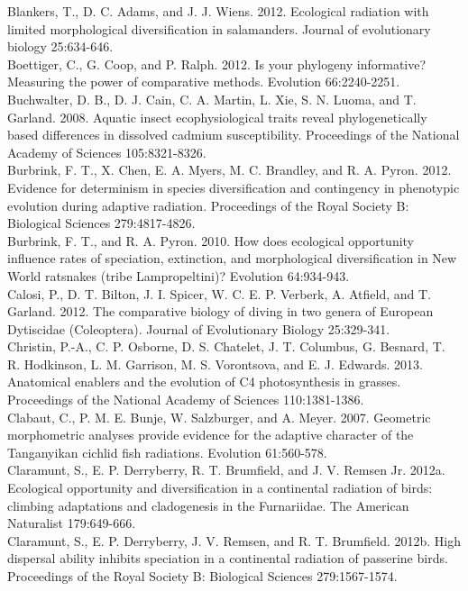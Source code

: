 Blankers, T., D. C. Adams, and J. J. Wiens. 2012. Ecological radiation with limited morphological diversification in salamanders. Journal of evolutionary biology 25:634-646.\\
Boettiger, C., G. Coop, and P. Ralph. 2012. Is your phylogeny informative? Measuring the power of comparative methods. Evolution 66:2240-2251.\\
Buchwalter, D. B., D. J. Cain, C. A. Martin, L. Xie, S. N. Luoma, and T. Garland. 2008. Aquatic insect ecophysiological traits reveal phylogenetically based differences in dissolved cadmium susceptibility. Proceedings of the National Academy of Sciences 105:8321-8326.\\
Burbrink, F. T., X. Chen, E. A. Myers, M. C. Brandley, and R. A. Pyron. 2012. Evidence for determinism in species diversification and contingency in phenotypic evolution during adaptive radiation. Proceedings of the Royal Society B: Biological Sciences 279:4817-4826.\\
Burbrink, F. T., and R. A. Pyron. 2010. How does ecological opportunity influence rates of speciation, extinction, and morphological diversification in New World ratsnakes (tribe Lampropeltini)? Evolution 64:934-943.\\
Calosi, P., D. T. Bilton, J. I. Spicer, W. C. E. P. Verberk, A. Atfield, and T. Garland. 2012. The comparative biology of diving in two genera of European Dytiscidae (Coleoptera). Journal of Evolutionary Biology 25:329-341.\\
Christin, P.-A., C. P. Osborne, D. S. Chatelet, J. T. Columbus, G. Besnard, T. R. Hodkinson, L. M. Garrison, M. S. Vorontsova, and E. J. Edwards. 2013. Anatomical enablers and the evolution of C4 photosynthesis in grasses. Proceedings of the National Academy of Sciences 110:1381-1386.\\
Clabaut, C., P. M. E. Bunje, W. Salzburger, and A. Meyer. 2007. Geometric morphometric analyses provide evidence for the adaptive character of the Tanganyikan cichlid fish radiations. Evolution 61:560-578.\\
Claramunt, S., E. P. Derryberry, R. T. Brumfield, and J. V. Remsen Jr. 2012a. Ecological opportunity and diversification in a continental radiation of birds: climbing adaptations and cladogenesis in the Furnariidae. The American Naturalist 179:649-666.\\
Claramunt, S., E. P. Derryberry, J. V. Remsen, and R. T. Brumfield. 2012b. High dispersal ability inhibits speciation in a continental radiation of passerine birds. Proceedings of the Royal Society B: Biological Sciences 279:1567-1574.\\
